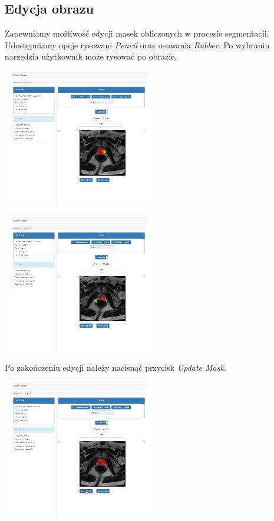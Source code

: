 \documentclass[a4paper,11pt,twoside]{report}
\theoremstyle{definition}
\begin{document}
\subsection{Edycja obrazu}

Zapewniamy możliwość edycji masek obliczonych w procesie segmentacji. Udostępniamy opcje rysowani \textit{Pencil} oraz usuwania \textit{Rubber}. Po wybraniu narzędzia użytkownik może rysować po obrazie.

\begin{minipage}[h]{\linewidth}
	\centering
	\includegraphics[width=0.5\textwidth]{FrontScreen/Editing/117.png}
\end{minipage}
\begin{minipage}[h]{\linewidth}
	\centering
	\includegraphics[width=0.5\textwidth]{FrontScreen/Editing/236.png}
\end{minipage}

Po zakończeniu edycji należy nacisnąć przycisk \textit{Update Mask}.

\begin{minipage}[h]{\linewidth}
	\centering
	\includegraphics[width=0.5\textwidth]{FrontScreen/Editing/170.png}
\end{minipage}
\end{document}
